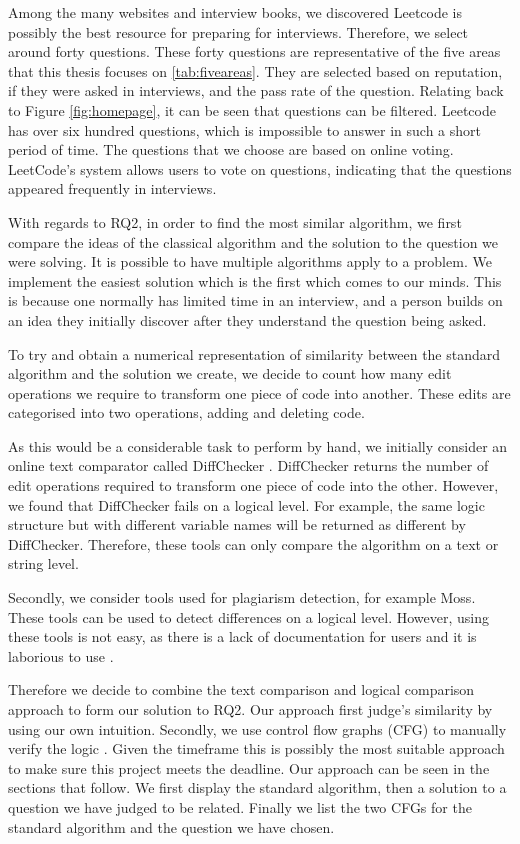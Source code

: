 \documentclass[10pt,twocolumn,hidelinks]{IEEEtran}
\begin{document}
\par Among the many websites and interview books, we discovered Leetcode is possibly the best resource for preparing for interviews. Therefore, we select around forty questions. These forty questions are representative of the five areas that this thesis focuses on \ref{tab:fiveareas}. They are selected based on reputation, if they were asked in interviews, and the pass rate of the question. Relating back to Figure \ref{fig:homepage}, it can be seen that questions can be filtered. Leetcode has over six hundred questions, which is impossible to answer in such a short period of time. The questions that we choose are based on online voting. LeetCode's system allows users to vote on questions, indicating that the questions appeared frequently in interviews.
\par With regards to RQ2, in order to find the most similar algorithm, we first compare the ideas of the classical algorithm and the solution to the question we were solving. It is possible to have multiple algorithms apply to a problem. We implement the easiest solution which is the first which comes to our minds. This is because one normally has limited time in an interview, and a person builds on an idea they initially discover after they understand the question being asked.
\par To try and obtain a numerical representation of similarity between the standard algorithm and the solution we create, we decide to count how many edit operations we require to transform one piece of code into another. These edits are categorised into two operations, adding and deleting code.
\par As this would be a considerable task to perform by hand, we initially consider an online text comparator called DiffChecker \cite{diff}. DiffChecker returns the number of edit operations required to transform one piece of code into the other. However, we found that DiffChecker fails on a logical level. For example, the same logic structure but with different variable names will be returned as different by DiffChecker. Therefore, these tools can only compare the algorithm on a text or string level. 
\par Secondly, we consider tools used for plagiarism detection, for example Moss. These tools can be used to detect differences on a logical level. However, using these tools is not easy, as there is a lack of documentation for users and it is laborious to use \cite{mosswebsite}. 
\par Therefore we decide to combine the text comparison and logical comparison approach to form our solution to RQ2. Our approach first judge's similarity by using our own intuition. Secondly, we use control flow graphs (CFG) to manually verify the logic \cite{softwaretesting}. Given the timeframe this is possibly the most suitable approach to make sure this project meets the deadline. Our approach can be seen in the sections that follow. We first display the standard algorithm, then a solution to a question we have judged to be related. Finally we list the two CFGs for the standard algorithm and the question we have chosen. 
\end{document}
